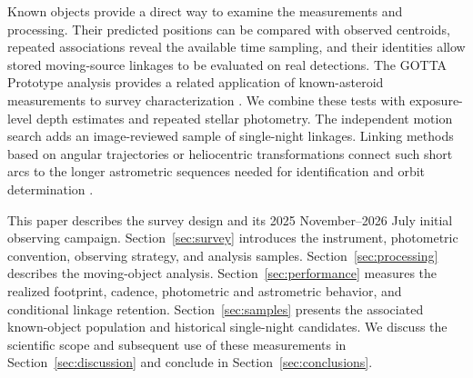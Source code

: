 Known objects provide a direct way to examine the measurements and
processing. Their predicted positions can be compared with observed
centroids, repeated associations reveal the available time sampling, and
their identities allow stored moving-source linkages to be evaluated on
real detections. The GOTTA Prototype analysis provides a related
application of known-asteroid measurements to survey characterization
\citep[in preparation]{Xiao2026InPrep}. We combine these tests with exposure-level depth
estimates and repeated stellar photometry. The independent motion search
adds an image-reviewed sample of single-night linkages. Linking methods
based on angular trajectories or heliocentric transformations connect such
short arcs to the longer astrometric sequences needed for identification
and orbit determination \citep{Kubica2007,Holman2018,Moeyens2021}.

This paper describes the survey design and its 2025 November--2026 July
initial observing campaign. Section~\ref{sec:survey} introduces the instrument,
photometric convention, observing strategy, and analysis samples.
Section~\ref{sec:processing} describes the moving-object analysis.
Section~\ref{sec:performance} measures the realized footprint, cadence,
photometric and astrometric behavior, and conditional linkage retention.
Section~\ref{sec:samples} presents the associated known-object population
and historical single-night candidates. We discuss the scientific scope
and subsequent use of these measurements in Section~\ref{sec:discussion}
and conclude in Section~\ref{sec:conclusions}.
